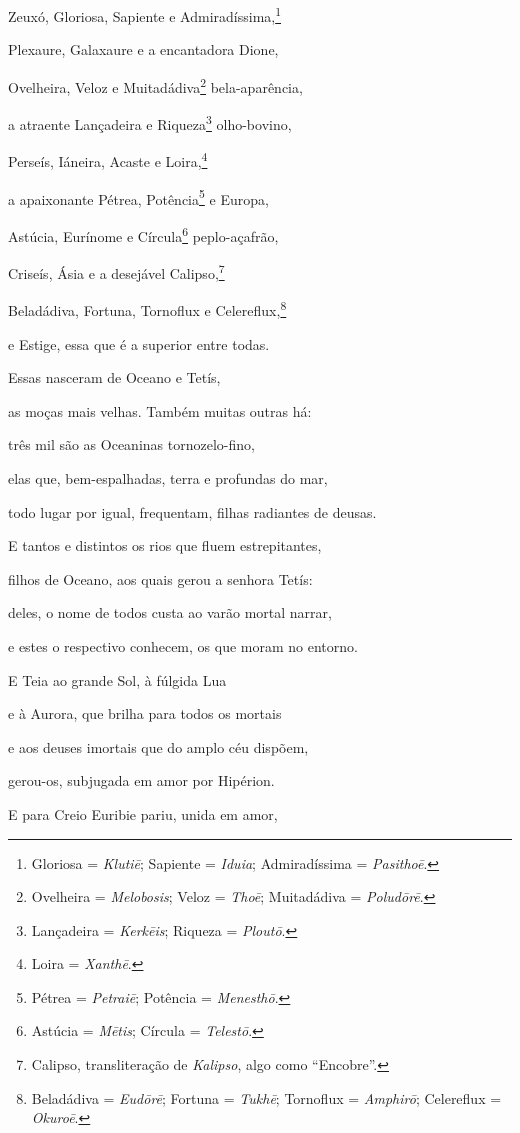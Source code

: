 \begin{pages}
\begin{Rightside}
Zeuxó, Gloriosa, Sapiente e Admiradíssima,\footnote{Gloriosa = \emph{Klutiē}; Sapiente = \emph{Iduia}; Admiradíssima =
\emph{Pasithoē}.}

Plexaure, Galaxaure e a encantadora Dione,

Ovelheira, Veloz e Muitadádiva\footnote{Ovelheira = \emph{Melobosis}; Veloz = \emph{Thoē}; Muitadádiva = \emph{Poludōrē}.} bela-aparência,

a atraente Lançadeira e Riqueza\footnote{Lançadeira = \emph{Kerkēis}; Riqueza = \emph{Ploutō}.} olho-bovino, 

Perseís, Iáneira, Acaste e Loira,\footnote{Loira = \emph{Xanthē}.}

a apaixonante Pétrea, Potência\footnote{Pétrea = \emph{Petraiē}; Potência = \emph{Menesthō}.} e Europa,

Astúcia, Eurínome e Círcula\footnote{Astúcia = \emph{Mētis}; Círcula = \emph{Telestō}.} peplo-açafrão,

Criseís, Ásia e a desejável Calipso,\footnote{Calipso, transliteração de \emph{Kalipso}, algo como ``Encobre''.}

Beladádiva, Fortuna, Tornoflux e Celereflux,\footnote{Beladádiva = \emph{Eudōrē}; Fortuna = \emph{Tukhē}; Tornoflux =
\emph{Amphirō}; Celereflux = \emph{Okuroē}.} 

e Estige, essa que é a superior entre todas.

Essas nasceram de Oceano e Tetís,

as moças mais velhas. Também muitas outras há:

três mil são as Oceaninas tornozelo-fino,

elas que, bem-espalhadas, terra e profundas do mar, 

todo lugar por igual, frequentam, filhas radiantes de deusas.

E tantos e distintos os rios que fluem estrepitantes,

filhos de Oceano, aos quais gerou a senhora Tetís:

deles, o nome de todos custa ao varão mortal narrar,

e estes o respectivo conhecem, os que moram no entorno. 

\quad{}E Teia ao grande Sol, à fúlgida Lua

e à Aurora, que brilha para todos os mortais

e aos deuses imortais que do amplo céu dispõem,

gerou-os, subjugada em amor por Hipérion.

E para Creio Euribie pariu, unida em amor, 


\end{Rightside}
\end{pages}

